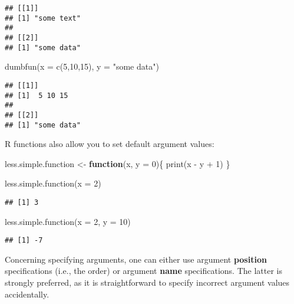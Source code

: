 \documentclass[
]{book}
\newenvironment{Shaded}{\begin{snugshade}}{\end{snugshade}}
\newcommand{\AttributeTok}[1]{\textcolor[rgb]{0.77,0.63,0.00}{#1}}
\newcommand{\ControlFlowTok}[1]{\textcolor[rgb]{0.13,0.29,0.53}{\textbf{#1}}}
\newcommand{\DecValTok}[1]{\textcolor[rgb]{0.00,0.00,0.81}{#1}}
\newcommand{\FunctionTok}[1]{\textcolor[rgb]{0.00,0.00,0.00}{#1}}
\newcommand{\NormalTok}[1]{#1}
\newcommand{\OtherTok}[1]{\textcolor[rgb]{0.56,0.35,0.01}{#1}}
\newcommand{\SpecialCharTok}[1]{\textcolor[rgb]{0.00,0.00,0.00}{#1}}
\newcommand{\StringTok}[1]{\textcolor[rgb]{0.31,0.60,0.02}{#1}}
\begin{document}
\begin{verbatim}
## [[1]]
## [1] "some text"
## 
## [[2]]
## [1] "some data"
\end{verbatim}

\begin{Shaded}
\begin{Highlighting}[]
\FunctionTok{dumbfun}\NormalTok{(}\AttributeTok{x =} \FunctionTok{c}\NormalTok{(}\DecValTok{5}\NormalTok{,}\DecValTok{10}\NormalTok{,}\DecValTok{15}\NormalTok{), }\AttributeTok{y =} \StringTok{"some data"}\NormalTok{)}
\end{Highlighting}
\end{Shaded}

\begin{verbatim}
## [[1]]
## [1]  5 10 15
## 
## [[2]]
## [1] "some data"
\end{verbatim}

R functions also allow you to set default argument values:

\begin{Shaded}
\begin{Highlighting}[]
\NormalTok{less.simple.function }\OtherTok{\textless{}{-}} \ControlFlowTok{function}\NormalTok{(x, }\AttributeTok{y =} \DecValTok{0}\NormalTok{)\{}
  \FunctionTok{print}\NormalTok{(x }\SpecialCharTok{{-}}\NormalTok{ y }\SpecialCharTok{+} \DecValTok{1}\NormalTok{)}
\NormalTok{\}}

\FunctionTok{less.simple.function}\NormalTok{(}\AttributeTok{x =} \DecValTok{2}\NormalTok{)}
\end{Highlighting}
\end{Shaded}

\begin{verbatim}
## [1] 3
\end{verbatim}

\begin{Shaded}
\begin{Highlighting}[]
\FunctionTok{less.simple.function}\NormalTok{(}\AttributeTok{x =} \DecValTok{2}\NormalTok{, }\AttributeTok{y =} \DecValTok{10}\NormalTok{)}
\end{Highlighting}
\end{Shaded}

\begin{verbatim}
## [1] -7
\end{verbatim}

Concerning specifying arguments, one can either use argument \textbf{position} specifications (i.e., the order) or argument \textbf{name} specifications. The latter is strongly preferred, as it is straightforward to specify incorrect argument values accidentally.
\end{document}
